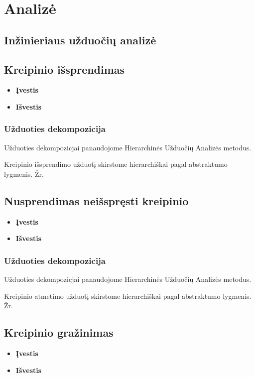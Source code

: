 \section{Analizė}

\subsection {Inžinieriaus užduočių analizė}
	\subsection {Kreipinio išsprendimas}
		\begin{itemize}
			\item \textbf{Įvestis}
			\item \textbf{Išvestis} 
		\end{itemize}
	\subsubsection {Užduoties dekompozicija}
	Užduoties dekompozicjai panaudojome Hierarchinės Užduočių Analizės metodus.
 		
	Kreipinio išsprendimo užduotį skirstome hierarchiškai pagal abstraktumo lygmenis. Žr. 

	\subsection {Nusprendimas neišspręsti kreipinio}
		\begin{itemize}
			\item \textbf{Įvestis}
			\item \textbf{Išvestis} 
		\end{itemize}
	\subsubsection {Užduoties dekompozicija}
	Užduoties dekompozicjai panaudojome Hierarchinės Užduočių Analizės metodus.
 		
	Kreipinio atmetimo užduotį skirstome hierarchiškai pagal abstraktumo lygmenis. Žr. 
	\subsection {Kreipinio gražinimas}	
		\begin{itemize}
			\item \textbf{Įvestis}
			\item \textbf{Išvestis} 
		\end{itemize}
